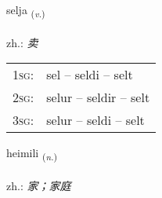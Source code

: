 \documentclass[frontgrid, backgrid]{flacards}\usepackage[]{graphicx}\usepackage[]{xcolor}
\begin{document}
\renewcommand{\blhead}{\vskip5pt {\small\bfseries\footnotesize Sagnorð | 动词 }}
\renewcommand{\bcfoot}{\vskip5pt \hspace{2pt}{\small\bfseries\footnotesize 1K}}


{selja \small{\textsubscript{(\textit{v.})}} \\[1ex] %
\textphonetic{[sɛlja]} \\
zh.: \emph{卖} \\  [2ex]
\renewcommand*{\arraystretch}{0.8}
\begin{tabular}{p{1cm}l}
\textsc{1sg}: & sel -- seldi -- selt \\ 
\textsc{2sg}: & selur -- seldir -- selt \\ 
\textsc{3sg}: & selur -- seldi -- selt \\ 
\end{tabular}
}

\renewcommand{\flhead}{\vskip5pt \fboxsep=0pt {\small\bfseries\footnotesize Nafnorð | 名词}}
\renewcommand{\fcfoot}{\vskip5pt \fboxsep=0pt \hspace{2pt}{\small\bfseries\footnotesize 1K}}

\renewcommand{\blhead}{\vskip5pt {\small\bfseries\footnotesize Nafnorð | 名词 }}
\renewcommand{\bcfoot}{\vskip5pt \hspace{2pt}{\small\bfseries\footnotesize 1K}}


{heimili \small{\textsubscript{(\textit{n.})}} \\[1ex] %
\textphonetic{[heiːmɪlɪ]} \\
zh.: \emph{家；家庭} \\  [2ex]
\renewcommand*{\arraystretch}{0.8}
}

\renewcommand{\flhead}{\vskip5pt \fboxsep=0pt {\small\bfseries\footnotesize Nafnorð | 名词}}
\renewcommand{\fcfoot}{\vskip5pt \fboxsep=0pt \hspace{2pt}{\small\bfseries\footnotesize 1K}}
\end{document}
